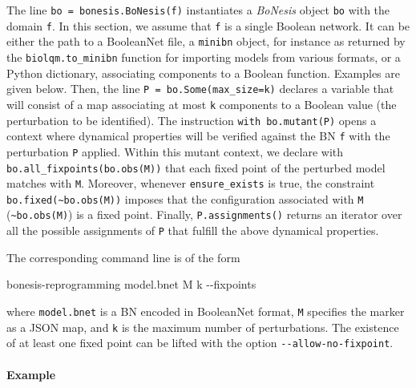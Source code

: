 \documentclass[PCJ,Unicode,screen,mode=plain]{cedram}
\newenvironment{Shaded}{}{}
\newcommand{\NormalTok}[1]{{#1}}
\newcommand{\ExtensionTok}[1]{{#1}}
\newcommand{\AttributeTok}[1]{\textcolor[rgb]{0.49,0.56,0.16}{{#1}}}
\begin{document}
The line \texttt{bo\ =\ bonesis.BoNesis(f)} instantiates a
\emph{BoNesis} object \texttt{bo} with the domain \texttt{f}. In this
section, we assume that \texttt{f} is a single Boolean network. It can
be either the path to a BooleanNet file, a \texttt{minibn} object, for
instance as returned by the \texttt{biolqm.to\_minibn} function for
importing models from various formats, or a Python dictionary,
associating components to a Boolean function. Examples are given below.
Then, the line \texttt{P\ =\ bo.Some(max\_size=k)} declares a variable
that will consist of a map associating at most \texttt{k} components to
a Boolean value (the perturbation to be identified). The instruction
\texttt{with\ bo.mutant(P)} opens a context where dynamical properties
will be verified against the BN \texttt{f} with the perturbation
\texttt{P} applied. Within this mutant context, we declare with
\texttt{bo.all\_fixpoints(bo.obs(M))} that each fixed point of the
perturbed model matches with \texttt{M}. Moreover, whenever
\texttt{ensure\_exists} is true, the constraint
\texttt{bo.fixed(\textasciitilde{}bo.obs(M))} imposes that the
configuration associated with \texttt{M}
(\texttt{\textasciitilde{}bo.obs(M)}) is a fixed point. Finally,
\texttt{P.assignments()} returns an iterator over all the possible
assignments of \texttt{P} that fulfill the above dynamical properties.

The corresponding command line is of the form

\begin{Shaded}
\begin{Highlighting}[]
\ExtensionTok{bonesis{-}reprogramming}\NormalTok{ model.bnet M k }\AttributeTok{{-}{-}fixpoints}
\end{Highlighting}
\end{Shaded}

where \texttt{model.bnet} is a BN encoded in BooleanNet format,
\texttt{M} specifies the marker as a JSON map, and \texttt{k} is the
maximum number of perturbations. The existence of at least one fixed
point can be lifted with the option \texttt{-\/-allow-no-fixpoint}.
\paragraph{Example}
\end{document}
